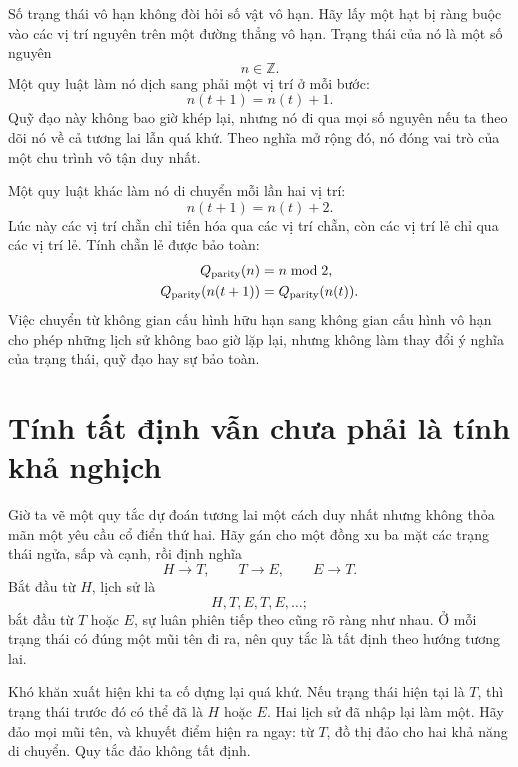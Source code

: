 Số trạng thái vô hạn không đòi hỏi số vật vô hạn. Hãy lấy một hạt bị ràng buộc vào các vị trí nguyên trên một đường thẳng vô hạn. Trạng thái của nó là một số nguyên
\[
  n\in\mathbb Z.
\]
Một quy luật làm nó dịch sang phải một vị trí ở mỗi bước:
\begin{equation}
  n(t+1)=n(t)+1.
  \label{eq:lattice-one}
\end{equation}
Quỹ đạo này không bao giờ khép lại, nhưng nó đi qua mọi số nguyên nếu ta theo dõi nó về cả tương lai lẫn quá khứ. Theo nghĩa mở rộng đó, nó đóng vai trò của một chu trình vô tận duy nhất.

Một quy luật khác làm nó di chuyển mỗi lần hai vị trí:
\begin{equation}
  n(t+1)=n(t)+2.
  \label{eq:lattice-two}
\end{equation}
Lúc này các vị trí chẵn chỉ tiến hóa qua các vị trí chẵn, còn các vị trí lẻ chỉ qua các vị trí lẻ. Tính chẵn lẻ được bảo toàn:
\begin{equation}
  \begin{aligned}
    Q_{\rm parity}(n)&=n\bmod 2,\\
    Q_{\rm parity}(n(t+1))&=Q_{\rm parity}(n(t)).
  \end{aligned}
\end{equation}
Việc chuyển từ không gian cấu hình hữu hạn sang không gian cấu hình vô hạn cho phép những lịch sử không bao giờ lặp lại, nhưng không làm thay đổi ý nghĩa của trạng thái, quỹ đạo hay sự bảo toàn.

\section{Tính tất định vẫn chưa phải là tính khả nghịch}

Giờ ta vẽ một quy tắc dự đoán tương lai một cách duy nhất nhưng không thỏa mãn một yêu cầu cổ điển thứ hai. Hãy gán cho một đồng xu ba mặt các trạng thái ngửa, sấp và cạnh, rồi định nghĩa
\begin{equation}
  H\to T,
  \qquad
  T\to E,
  \qquad
  E\to T.
  \label{eq:nonreversible-map}
\end{equation}
Bắt đầu từ \(H\), lịch sử là
\[
  H,T,E,T,E,\ldots;
\]
bắt đầu từ \(T\) hoặc \(E\), sự luân phiên tiếp theo cũng rõ ràng như nhau. Ở mỗi trạng thái có đúng một mũi tên đi ra, nên quy tắc là tất định theo hướng tương lai.

Khó khăn xuất hiện khi ta cố dựng lại quá khứ. Nếu trạng thái hiện tại là \(T\), thì trạng thái trước đó có thể đã là \(H\) hoặc \(E\). Hai lịch sử đã nhập lại làm một. Hãy đảo mọi mũi tên, và khuyết điểm hiện ra ngay: từ \(T\), đồ thị đảo cho hai khả năng di chuyển. Quy tắc đảo không tất định.

